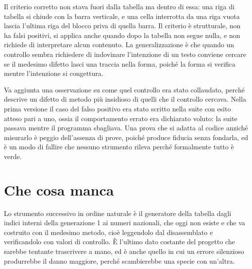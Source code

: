 Il criterio corretto non stava fuori dalla tabella ma dentro di essa: una riga di tabella si chiude con la barra verticale, e una cella interrotta da una riga vuota lascia l'ultima riga del blocco priva di quella barra. Il criterio è strutturale, non ha falsi positivi, si applica anche quando dopo la tabella non segue nulla, e non richiede di interpretare alcun contenuto. La generalizzazione è che quando un controllo sembra richiedere di indovinare l'intenzione di un testo conviene cercare se il medesimo difetto lasci una traccia nella forma, poiché la forma si verifica mentre l'intenzione si congettura.

Va aggiunta una osservazione su come quel controllo era stato collaudato, perché descrive un difetto di metodo più insidioso di quelli che il controllo cercava. Nella prima versione il caso del falso positivo era stato scritto nella suite con esito atteso pari a uno, ossia il comportamento errato era dichiarato voluto: la suite passava mentre il programma sbagliava. Una prova che si adatta al codice anziché misurarlo è peggio dell'assenza di prove, poiché produce fiducia senza fondarla, ed è un modo di fallire che nessuno strumento rileva perché formalmente tutto è verde.

\section{Che cosa manca}

Lo strumento successivo in ordine naturale è il generatore della tabella dagli indici interni della generazione 1 ai numeri nazionali, che oggi non esiste e che va costruito con il medesimo metodo, cioè leggendolo dal disassemblato e verificandolo con valori di controllo. È l'ultimo dato costante del progetto che sarebbe tentante trascrivere a mano, ed è anche quello in cui un errore silenzioso produrrebbe il danno maggiore, perché scambierebbe una specie con un'altra.
